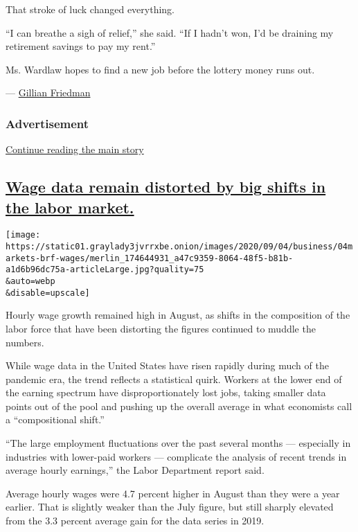 That stroke of luck changed everything.

``I can breathe a sigh of relief,'' she said. ``If I hadn't won, I'd be
draining my retirement savings to pay my rent.''

Ms. Wardlaw hopes to find a new job before the lottery money runs out.

--- \href{http://nytimes3xbfgragh.onion/by/gillian-friedman}{Gillian
Friedman}

\hypertarget{advertisement-1}{%
\subsubsection{Advertisement}\label{advertisement-1}}

\protect\hyperlink{after-dfp-ad-mid2}{Continue reading the main story}

\hypertarget{wage-data-remain-distorted-by-big-shifts-in-the-labor-market}{%
\subsection{\texorpdfstring{\protect\hyperlink{wage-data-remain-distorted-by-big-shifts-in-the-labor-market}{Wage
data remain distorted by big shifts in the labor
market.}}{Wage data remain distorted by big shifts in the labor market.}}\label{wage-data-remain-distorted-by-big-shifts-in-the-labor-market}}

\texttt{[image: https://static01.graylady3jvrrxbe.onion/images/2020/09/04/business/04markets-brf-wages/merlin\_174644931\_a47c9359-8064-48f5-b81b-a1d6b96dc75a-articleLarge.jpg?quality=75\\\&auto=webp\\\&disable=upscale]}

Hourly wage growth remained high in August, as shifts in the composition
of the labor force that have been distorting the figures continued to
muddle the numbers.

While wage data in the United States have risen rapidly during much of
the pandemic era, the trend reflects a statistical quirk. Workers at the
lower end of the earning spectrum have disproportionately lost jobs,
taking smaller data points out of the pool and pushing up the overall
average in what economists call a ``compositional shift.''

``The large employment fluctuations over the past several months ---
especially in industries with lower-paid workers --- complicate the
analysis of recent trends in average hourly earnings,'' the Labor
Department report said.

Average hourly wages were 4.7 percent higher in August than they were a
year earlier. That is slightly weaker than the July figure, but still
sharply elevated from the 3.3 percent average gain for the data series
in 2019.

